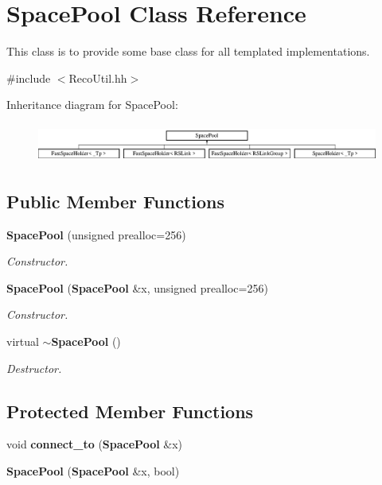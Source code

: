 \section{Space\-Pool Class Reference}
\label{classSpacePool}


This class is to provide some base class for all templated implementations.  




{\ttfamily \#include $<$Reco\-Util.\-hh$>$}

Inheritance diagram for Space\-Pool\-:\begin{figure}[H]
\begin{center}
\leavevmode
\includegraphics[height=1.296296cm]{classSpacePool}
\end{center}
\end{figure}
\subsection*{Public Member Functions}
\begin{DoxyCompactItemize}
\item 
{\bf Space\-Pool} (unsigned prealloc=256)\label{classSpacePool_a4778bf95fa19030a2eda2b9652ca66fb}

\begin{DoxyCompactList}\small\item\em Constructor. \end{DoxyCompactList}\item 
{\bf Space\-Pool} ({\bf Space\-Pool} \&x, unsigned prealloc=256)\label{classSpacePool_ae5816739b4f2ed2b1a41a989e692a644}

\begin{DoxyCompactList}\small\item\em Constructor. \end{DoxyCompactList}\item 
virtual {\bf $\sim$\-Space\-Pool} ()\label{classSpacePool_a8ddca1507b0d3112b5304572d4a83f97}

\begin{DoxyCompactList}\small\item\em Destructor. \end{DoxyCompactList}\end{DoxyCompactItemize}
\subsection*{Protected Member Functions}
\begin{DoxyCompactItemize}
\item 
void {\bfseries connect\-\_\-to} ({\bf Space\-Pool} \&x)\label{classSpacePool_a3d1b4392f58b92aed09ac972b1244114}

\item 
{\bfseries Space\-Pool} ({\bf Space\-Pool} \&x, bool)\label{classSpacePool_ab80170ef5ee1fbc371ea2ff4ead7a38b}

\end{DoxyCompactItemize}
